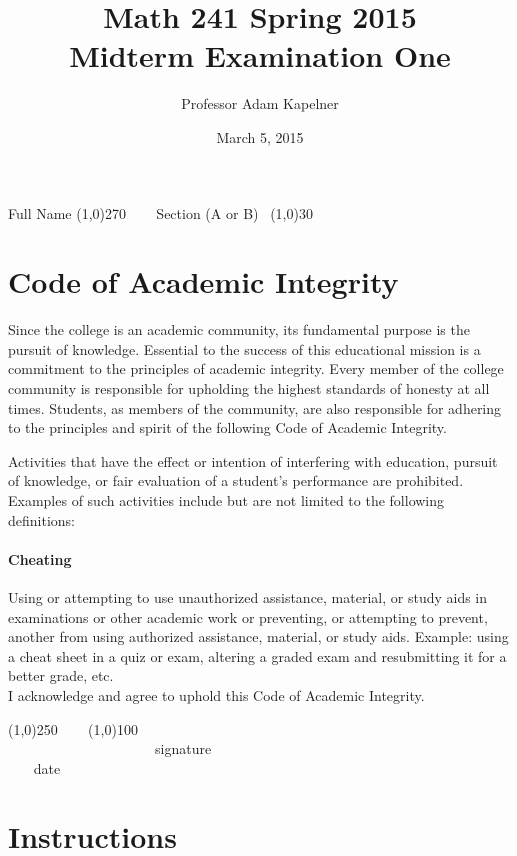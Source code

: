 \documentclass[12pt]{article}
\title{Math 241 Spring 2015 \\ Midterm Examination One}
\author{Professor Adam Kapelner}
\date{March 5, 2015}
\begin{document}
\maketitle

\noindent Full Name \line(1,0){270} ~~~ Section (A or B)~ \line(1,0){30}

\thispagestyle{empty}

\section*{Code of Academic Integrity}

\footnotesize
Since the college is an academic community, its fundamental purpose is the pursuit of knowledge. Essential to the success of this educational mission is a commitment to the principles of academic integrity. Every member of the college community is responsible for upholding the highest standards of honesty at all times. Students, as members of the community, are also responsible for adhering to the principles and spirit of the following Code of Academic Integrity.

Activities that have the effect or intention of interfering with education, pursuit of knowledge, or fair evaluation of a student's performance are prohibited. Examples of such activities include but are not limited to the following definitions:

\paragraph{Cheating} Using or attempting to use unauthorized assistance, material, or study aids in examinations or other academic work or preventing, or attempting to prevent, another from using authorized assistance, material, or study aids. Example: using a cheat sheet in a quiz or exam, altering a graded exam and resubmitting it for a better grade, etc.
\\

\noindent I acknowledge and agree to uphold this Code of Academic Integrity. \\

\begin{center}
\line(1,0){250} ~~~ \line(1,0){100}\\
~~~~~~~~~~~~~~~~~~~~~signature~~~~~~~~~~~~~~~~~~~~~~~~~~~~~~~~~~~~~~~~~~~~~ date
\end{center}

\normalsize

\section*{Instructions}
\end{document}

